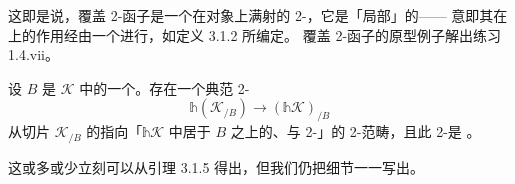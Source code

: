 这即是说，覆盖 2-函子是一个在对象上满射的 2-\trTwoFunctor，它是「局部\trSmothering」的——%
意即其在\trHomCategory{}上的作用经由一个\trSmotheringFunctor{}进行，如定义 3.1.2 所编定。
覆盖 2-函子的原型例子解出练习 1.4.vii。

\begin{proposition}\label{prop:canonical-comparison}
设 $B$ 是\trInfinityCosmos{} $\mathcal{K}$ 中的一个\trInfinityCategory。存在一个典范 %
2-\trTwoFunctor
\[
\mathbb{h}(\mathcal{K}_{/B})\longrightarrow(\mathbb{h}\mathcal{K})_{/B}
\]
从切片\trInfinityCosmos{} $\mathcal{K}_{/B}$ 的\trHomotopyTwoCategory{}指向「$\mathbb{h}\mathcal{K}$ %
中居于 $B$ 之上的\trIsofibration、\trFunctor{}与 2-\trCell{}」的 2-范畴，且此 2-\trTwoFunctor{}是%
\trSmothering。
\end{proposition}

这或多或少立刻可以从引理 3.1.5 得出，但我们仍把细节一一写出。

